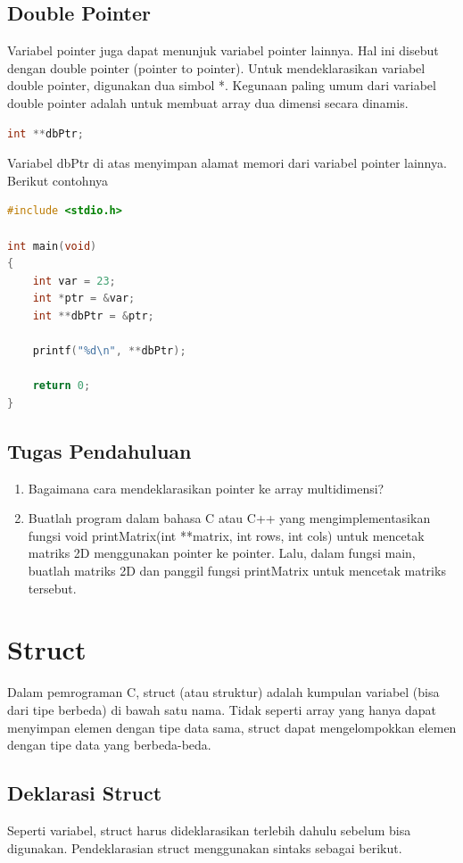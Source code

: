 \subsection{Double Pointer}
Variabel pointer juga dapat menunjuk variabel pointer lainnya.
Hal ini disebut dengan double pointer (pointer to pointer).
Untuk mendeklarasikan variabel double pointer, digunakan dua simbol *.
Kegunaan paling umum dari variabel double pointer adalah untuk membuat array dua dimensi secara dinamis.
\begin{lstlisting}[language=c]
    int **dbPtr;
\end{lstlisting}
Variabel dbPtr di atas menyimpan alamat memori dari variabel pointer lainnya. \\
Berikut contohnya
\begin{lstlisting}[language=c,  caption={Contoh Double Pointer}]
#include <stdio.h>

int main(void)
{
    int var = 23;
    int *ptr = &var;
    int **dbPtr = &ptr;

    printf("%d\n", **dbPtr);
        
    return 0;
}
\end{lstlisting}

\subsection{Tugas Pendahuluan}
\begin{enumerate}
    \item Bagaimana cara mendeklarasikan pointer ke array multidimensi?
    \item Buatlah program dalam bahasa C atau C++ yang mengimplementasikan
          fungsi void printMatrix(int **matrix, int rows, int cols) untuk mencetak matriks 2D menggunakan pointer ke pointer. Lalu, dalam fungsi main,
          buatlah matriks 2D dan panggil fungsi printMatrix untuk mencetak matriks tersebut.
\end{enumerate}

\section{Struct}
Dalam pemrograman C, struct (atau struktur) adalah kumpulan variabel (bisa dari tipe berbeda) di bawah satu nama.
Tidak seperti array yang hanya dapat menyimpan elemen dengan tipe data sama,
struct dapat mengelompokkan elemen dengan tipe data yang berbeda-beda.


\subsection{Deklarasi Struct}
Seperti variabel, struct harus dideklarasikan terlebih dahulu sebelum bisa digunakan. Pendeklarasian struct menggunakan sintaks sebagai berikut.

